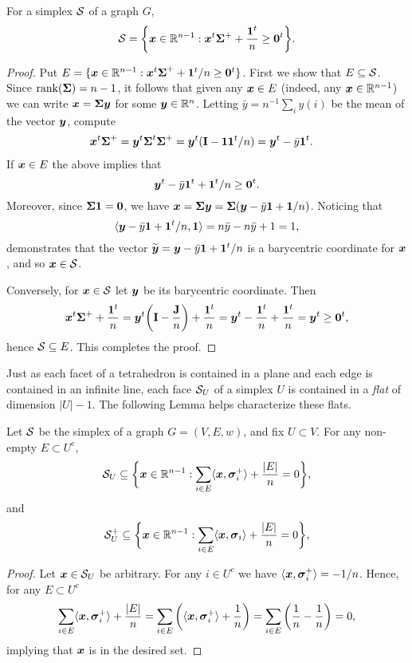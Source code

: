 \begin{lemma}
\label{lem:S_alt_desc}
For a simplex $\mathcal{S}$ of a graph $G$, 
\begin{equation}
\label{eq:S_alt_desc}
    \mathcal{S}=\bigg\{\vb*{x}\in \mathbb{R}^{n-1}:\vb*{x}^t\boldsymbol{\Sigma}^++\frac{\vb{1}^t}{n}\geq \vb{0}^t\bigg\}.
\end{equation}
\end{lemma}
\begin{proof}
Put $E=\{\vb*{x}\in \mathbb{R}^{n-1}:\vb*{x}^t\boldsymbol{\Sigma}^++\vb{1}^t/n\geq \vb{0}^t\}$. First we show that $E\subseteq\mathcal{S}$. 
Since $\rank(\boldsymbol{\Sigma})=n-1$, it follows that given any $\vb*{x}\in E$ (indeed, any $\vb*{x}\in\mathbb{R}^{n-1}$) we can write $\vb*{x}=\boldsymbol{\Sigma}\vb*{y}$ for some $\vb*{y}\in\mathbb{R}^n$. Letting $\bar{y}=n^{-1}\sum_i y(i)$ be the mean of the vector $\vb*{y}$, compute
\begin{align*}
    \vb*{x}^t\boldsymbol{\Sigma}^+ &= \vb*{y}^t \boldsymbol{\Sigma}^t\boldsymbol{\Sigma}^+ = \vb*{y}^t(\vb{I}-\vb{1}\vb{1}^t/n)=\vb*{y}^t - \bar{y}\vb{1}^t.
\end{align*}
If $\vb*{x}\in E$ the above implies that 
\[\vb*{y}^t-\bar{y}\vb{1}^t + \vb{1}^t/n\geq \vb{0}^t.\]
Moreover, since $\boldsymbol{\Sigma}\vb{1}=\vb{0}$, we have $\vb*{x}=\boldsymbol{\Sigma}\vb*{y}=\boldsymbol{\Sigma}(\vb*{y}-\bar{y}\vb{1} +\vb{1}/n)$. Noticing that 
\[\langle \vb*{y}-\bar{y}\vb{1}+\vb{1}^t/n,\vb{1}\rangle = n\bar{y}-n\bar{y}+1=1,\]
demonstrates that the vector $\widetilde{\vb*{y}}=\vb*{y}-\bar{y}\vb{1}+\vb{1}^t/n$ is a barycentric coordinate for $\vb*{x}$, and so $\vb*{x}\in \mathcal{S}$. 

Conversely, for $\vb*{x}\in\mathcal{S}$ let $\vb*{y}$ be its barycentric coordinate. Then 
\[\vb*{x}^t\boldsymbol{\Sigma}^++\frac{\vb{1}^t}{n}=\vb*{y}^t\bigg(\vb{I}-\frac{\vb{J}}{n}\bigg)+\frac{\vb{1}^t}{n}=\vb*{y}^t - \frac{\vb{1}^t}{n}+\frac{\vb{1}^t}{n}=\vb*{y}^t\geq \vb{0}^t, \]
hence $\mathcal{S}\subseteq E$. This completes the proof. 
 \end{proof}

Just as each facet of a tetrahedron is contained in a plane and each edge is contained in an infinite line, each face $\mathcal{S}_U$ of a simplex $U$ is contained in a \emph{flat} of dimension $|U|-1$. The following Lemma helps characterize these flats. 

\begin{lemma}
\label{lem:SUsubset}
Let $\mathcal{S}$ be the simplex of a graph $G=(V,E,w)$, and fix $U\subset V$. For any non-empty $E\subset U^c$,
\begin{equation*}
    \mathcal{S}_U \subseteq \bigg\{\vb*{x}\in\mathbb{R}^{n-1}: \sum_{i\in E}\langle \vb*{x},\vb*{\sigma}_i^+\rangle +\frac{|E|}{n}=  0\bigg\},
\end{equation*}
and
\begin{equation*}
    \mathcal{S}^+_U \subseteq \bigg\{\vb*{x}\in\mathbb{R}^{n-1}: \sum_{i\in E}\langle \vb*{x},\vb*{\sigma}_i\rangle +\frac{|E|}{n}=  0\bigg\},
\end{equation*}
\end{lemma}
\begin{proof}
Let $\vb*{x}\in\mathcal{S}_U$ be arbitrary. For any $i\in U^c$ we have $\langle \vb*{x},\vb*{\sigma}_i^+\rangle = -1/n$. Hence, for any $E\subset U^c$
\[\sum_{i\in E}\langle \vb*{x},\vb*{\sigma}_i^+\rangle + \frac{|E|}{n} = \sum_{i\in E}\bigg(\langle \vb*{x},\vb*{\sigma}_i^+\rangle+\frac{1}{n}\bigg)=\sum_{i\in E}\bigg(\frac{1}{n}-\frac{1}{n}\bigg)=0,\]
implying that $\vb*{x}$ is in the desired set. 
\end{proof}

